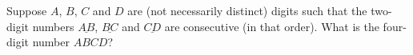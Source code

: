 Suppose $A$, $B$, $C$ and $D$ are (not necessarily distinct) digits such that the two-digit numbers $\underline{AB}$, $\underline{BC}$ and $\underline{CD}$ are consecutive (in that order). What is the four-digit number $ABCD$?
